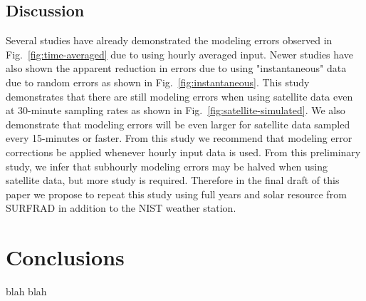 \documentclass[conference]{IEEEtran}
\begin{document}
\subsection{Discussion}
Several studies have already demonstrated the modeling errors observed in Fig.~\ref{fig:time-averaged} due to using hourly averaged input. Newer studies have also shown the apparent reduction in errors due to using "instantaneous" data due to random errors as shown in Fig.~\ref{fig:instantaneous}. This study demonstrates that there are still modeling errors when using satellite data even at 30-minute sampling rates as shown in Fig.~\ref{fig:satellite-simulated}. We also demonstrate that modeling errors will be even larger for satellite data sampled every 15-minutes or faster. From this study we recommend that modeling error corrections be applied whenever hourly input data is used. From this preliminary study, we infer that subhourly modeling errors may be halved when using satellite data, but more study is required. Therefore in the final draft of this paper we propose to repeat this study using full years and solar resource from SURFRAD in addition to the NIST weather station.

\section{Conclusions}
blah blah



\end{document}
